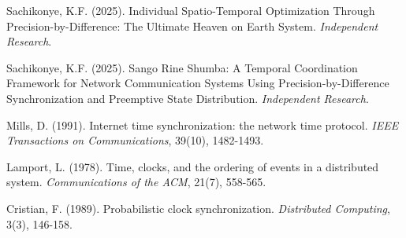 \documentclass[12pt,a4paper]{article}
\begin{document}
\begin{thebibliography}{99}
Sachikonye, K.F. (2025). Individual Spatio-Temporal Optimization Through Precision-by-Difference: The Ultimate Heaven on Earth System. \textit{Independent Research}.

Sachikonye, K.F. (2025). Sango Rine Shumba: A Temporal Coordination Framework for Network Communication Systems Using Precision-by-Difference Synchronization and Preemptive State Distribution. \textit{Independent Research}.

Mills, D. (1991). Internet time synchronization: the network time protocol. \textit{IEEE Transactions on Communications}, 39(10), 1482-1493.

Lamport, L. (1978). Time, clocks, and the ordering of events in a distributed system. \textit{Communications of the ACM}, 21(7), 558-565.

Cristian, F. (1989). Probabilistic clock synchronization. \textit{Distributed Computing}, 3(3), 146-158.

\end{thebibliography}
\end{document}
